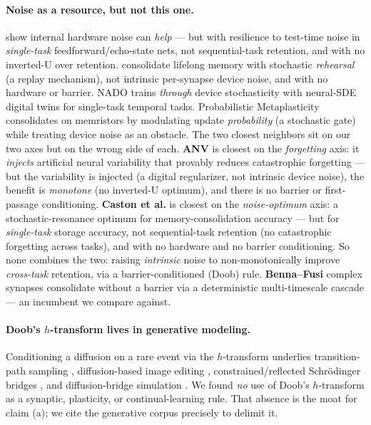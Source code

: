 \documentclass[11pt]{article}
\begin{document}
\paragraph{Noise as a resource, but not this one.}
\citet{kolesnikov2025} show internal hardware noise can \emph{help} --- but with
resilience to test-time noise in \emph{single-task} feedforward/echo-state nets, not
sequential-task retention, and with no inverted-U over retention. \citet{shaham2022}
consolidate lifelong memory with stochastic \emph{rehearsal} (a replay mechanism),
not intrinsic per-synapse device noise, and with no hardware or barrier. NADO
\citep{nado2025} trains \emph{through} device stochasticity with neural-SDE digital
twins for single-task temporal tasks. Probabilistic Metaplasticity
\citep{probmetaplast2024} consolidates on memristors by modulating update
\emph{probability} (a stochastic gate) while treating device noise as an obstacle.
The two closest neighbors sit on our two axes but on the wrong side of each.
\textbf{ANV} \citep{xie2021anv} is closest on the \emph{forgetting} axis: it
\emph{injects} artificial neural variability that provably reduces catastrophic
forgetting --- but the variability is injected (a digital regularizer, not intrinsic
device noise), the benefit is \emph{monotone} (no inverted-U optimum), and there is
no barrier or first-passage conditioning. \textbf{Caston et al.} \citep{caston2022}
is closest on the \emph{noise-optimum} axis: a stochastic-resonance optimum for
memory-consolidation accuracy --- but for \emph{single-task} storage accuracy, not
sequential-task retention (no catastrophic forgetting across tasks), and with no
hardware and no barrier conditioning. So none combines the two: raising
\emph{intrinsic} noise to non-monotonically improve \emph{cross-task} retention, via
a barrier-conditioned (Doob) rule. \textbf{Benna--Fusi} complex synapses
\citep{bennafusi2016} consolidate without a barrier via a deterministic
multi-timescale cascade --- an incumbent we compare against.

\paragraph{Doob's $h$-transform lives in generative modeling.}
Conditioning a diffusion on a rare event via the $h$-transform underlies
transition-path sampling \citep{doobslagrangian2025}, diffusion-based image editing
\citep{hedit2025}, constrained/reflected Schr\"odinger bridges
\citep{reflectedsb2024}, and diffusion-bridge simulation \citep{diffusionbridges2021}.
We found \emph{no} use of Doob's $h$-transform as a synaptic, plasticity, or
continual-learning rule. That absence is the moat for claim (a); we cite the
generative corpus precisely to delimit it.
\end{document}
